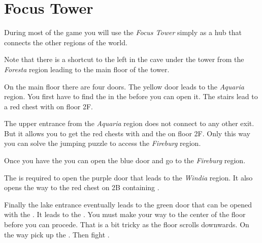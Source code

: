 \section{Focus Tower}
\label{map:focus_tower}

During most of the game you will use the \textit{Focus Tower} simply as a hub that connects the other regions of the world.

Note that there is a shortcut to the left in the cave under the tower from the \textit{Foresta} region leading to the main floor of the tower.

On the main floor there are four doors. The yellow door leads to the \textit{Aquaria} region. You first have to find the  in the  before you can open it. The stairs lead to a red chest with  on floor 2F.

The upper entrance from the \textit{Aquaria} region does not connect to any other exit. But it allows you to get the red chests with  and the  on floor 2F. Only this way you can solve the jumping puzzle to access the \textit{Fireburg} region.

Once you have the  you can open the blue door and go to the \textit{Fireburg} region.

The  is required to open the purple door that leads to the \textit{Windia} region. It also opens the way to the red chest on 2B containing .

Finally the lake entrance eventually leads to the green door that can be opened with the . It leads to the . You must make your way to the center of the floor before you can procede. That is a bit tricky as the floor scrolls downwards. On the way pick up the . Then fight .



